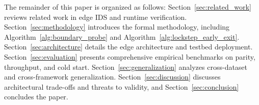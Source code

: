 The remainder of this paper is organized as follows: Section~\ref{sec:related_work} reviews related work in edge IDS and runtime verification. Section~\ref{sec:methodology} introduces the formal methodology, including Algorithm~\ref{alg:boundary_probe} and Algorithm~\ref{alg:lockstep_early_exit}. Section~\ref{sec:architecture} details the edge architecture and testbed deployment. Section~\ref{sec:evaluation} presents comprehensive empirical benchmarks on parity, throughput, and cold start. Section~\ref{sec:generalization} analyzes cross-dataset and cross-framework generalization. Section~\ref{sec:discussion} discusses architectural trade-offs and threats to validity, and Section~\ref{sec:conclusion} concludes the paper.
